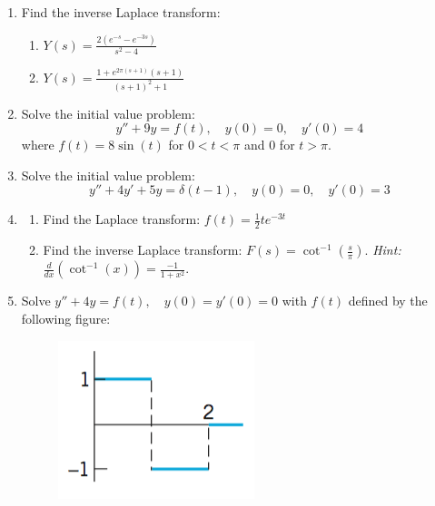 \documentclass[letterpaper, fontsize=11pt]{scrartcl} %
\numberwithin{equation}{section} %
\numberwithin{figure}{section} %
\numberwithin{table}{section} %
\begin{document}
\begin{enumerate}
\item Find the inverse Laplace transform:
\begin{enumerate}
\item $Y(s) = \frac{2(e^{-s} - e^{-3s})}{s^2 - 4}$

\item $Y(s) = \frac{1 + e^{2\pi(s+1)}(s +1)}{(s + 1)^2 + 1}$
\end{enumerate}

\item Solve the initial value problem: $$y'' + 9y = f(t),\quad y(0) = 0,\quad y'(0) = 4$$ where $f(t) = 8\sin(t)$ for $0 < t < \pi$ and 0 for $t > \pi$.

\item Solve the initial value problem:
$$y'' + 4y' + 5y = \delta(t-1),\quad y(0) = 0,\quad y'(0) = 3$$

\item 
\begin{enumerate}
\item Find the Laplace transform: $f(t) = \frac{1}{2}te^{-3t}$

\item Find the inverse Laplace transform: $F(s) =\cot^{-1}\left(\frac{s}{\pi}\right)$. \textit{Hint:} $\frac{d}{dx}\left(\cot^{-1}(x)\right) = \frac{-1}{1 + x^2}$.

\end{enumerate}

\item Solve $y'' + 4y = f(t),\quad y(0) = y'(0) = 0$ with $f(t)$ defined by the following figure:
\begin{figure}[H]
\centering \includegraphics[width = 0.3\columnwidth]{LaplaceFig2.png}
\end{figure}

\end{enumerate}



\end{document}
